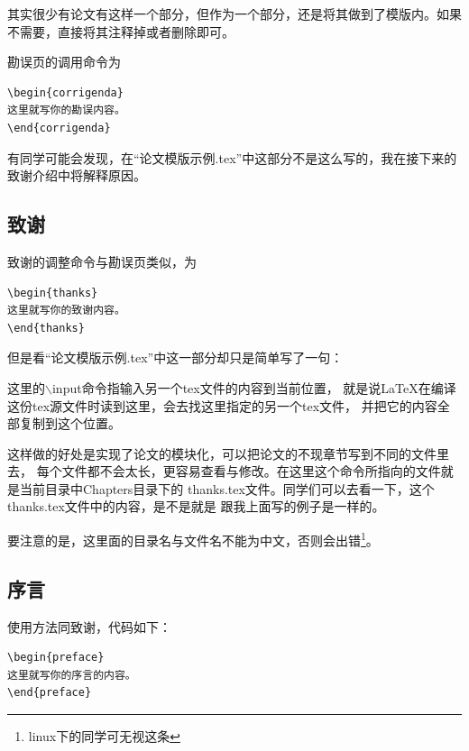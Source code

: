 其实很少有论文有这样一个部分，但作为一个部分，还是将其做到了模版内。如果不需要，直接将其注释掉或者删除即可。

勘误页的调用命令为

{
\linespread{1}
\noindent
\begin{verbatim}
\begin{corrigenda}
这里就写你的勘误内容。
\end{corrigenda}
\end{verbatim}
}

有同学可能会发现，在“论文模版示例.tex”中这部分不是这么写的，我在接下来的致谢介绍中将解释原因。

\subsection{致谢}

致谢的调整命令与勘误页类似，为

{
\linespread{1}
\noindent
\begin{verbatim}
\begin{thanks}
这里就写你的致谢内容。
\end{thanks}
\end{verbatim}
}

但是看“论文模版示例.tex”中这一部分却只是简单写了一句：

\verb++

这里的$\backslash$input命令指输入另一个tex文件的内容到当前位置，
就是说\LaTeX 在编译这份tex源文件时读到这里，会去找这里指定的另一个tex文件，
并把它的内容全部复制到这个位置。

这样做的好处是实现了论文的模块化，可以把论文的不现章节写到不同的文件里去，
每个文件都不会太长，更容易查看与修改。在这里这个命令所指向的文件就是当前目录中Chapters目录下的
thanks.tex文件。同学们可以去看一下，这个thanks.tex文件中的内容，是不是就是
跟我上面写的例子是一样的。

要注意的是，这里面的目录名与文件名不能为中文，否则会出错\footnote{linux下的同学可无视这条}。

\subsection{序言}

使用方法同致谢，代码如下：

{
\linespread{1}
\noindent
\begin{verbatim}
\begin{preface}
这里就写你的序言的内容。
\end{preface}
\end{verbatim}
}

